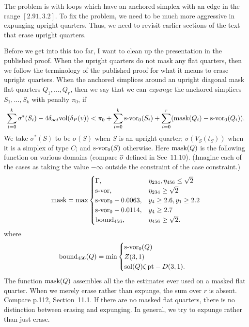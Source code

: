 \documentclass[11pt]{amsart}
\def\op#1{{\text{#1}}}
\def\text{\hbox}
\begin{document}
The problem is with loops which have an anchored simplex with an edge in the range $[2.91,3.2]$.  To fix the problem, we need to be much more aggressive 
in expunging upright quarters.  Thus, we need to revisit earlier sections of the text that erase upright quarters.

Before we get into this too far, I want to clean up the presentation in the published proof.  When the upright quarters do not mask any flat quarters, then we follow the terminology of the published proof for what it means to erase upright quarters.  When the anchored simplices around an upright diagonal mask flat quarters $Q_1,\ldots,Q_r$, then we say that we can {\it expunge} the anchored simplices $S_1,\ldots,S_k$ with penalty $\pi_0$, if 
  $$
  \sum_{i=0}^k \sigma^*(S_i) - 4\delta_{oct}\op{vol}(\delta_P(v))
  < \pi_0 + \sum_{i=0}^k \op{s-vor}_0(S_i)
   +\sum_{i=0}^r (\op{mask}(Q_i) - \op{s-vor}_0(Q_i)).
  $$
We take $\sigma^*(S)$ to be $\sigma(S)$ when $S$ is an upright quarter; $\sigma(V_S(t_S))$ when it is a simplex of type $C$; and $\op{s-vor}_0(S)$ otherwise.
Here $\op{mask}(Q)$ is the following function on various domains (compare $\hat\sigma$ defined in Sec~11.10).  (Imagine each of the
cases as taking the value $-\infty$ outside
the constraint of the case constraint.)
  $$
  \op{mask} = \op{max}
  \begin{cases}
  \Gamma{}{},   & \eta_{234},\eta_{456}\le \sqrt2\\
  \op{s-vor}, & \eta_{234}\ge \sqrt2\\
  \op{s-vor}_0 - 0.0063, & y_4\ge 2.6, y_1\ge 2.2\\
  \op{s-vor}_0 - 0.0114, & y_4 \ge 2.7\\
  \op{bound}_{456}, & \eta_{456}\ge \sqrt2.\\
  \end{cases}
  $$
where
  $$
  \op{bound}_{456}(Q) = \min
  \begin{cases}
  \op{s-vor}_0(Q) &\\
  Z(3,1) &\\
  \op{sol}(Q)\zeta\,\op{pt} - D(3,1).&\\
  \end{cases}
  $$
The function $\op{mask}(Q)$ assembles all the the estimates ever used
on a masked flat quarter.
When we merely erase rather than expunge, the sum over $r$ is absent. Compare p.112, Section~11.1.
If there are no masked flat quarters,  there is no distinction between erasing and expunging.   In general, we try to expunge rather than just erase.
\end{document}
